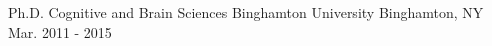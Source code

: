 \begin{cventries}
\cventry
{Ph.D. Cognitive and Brain Sciences} %
{Binghamton University} %
{Binghamton, NY} %
{Mar. 2011 - 2015} %
{}
\end{cventries}

